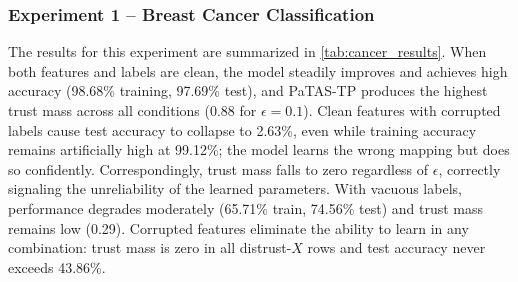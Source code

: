 \subsubsection*{Experiment 1 -- Breast Cancer Classification}
\begin{table}[ht]
\caption{Summary of final trust mass across four values of $\epsilon$ and corresponding train/test accuracies for the Breast Cancer Classification Experiment.}
\label{tab:cancer_results}
\end{table}

The results for this experiment are summarized in \cref{tab:cancer_results}. When both features and labels are clean, the model steadily improves and achieves high accuracy (98.68\% training, 97.69\% test), and \ac{PaTAS-TP} produces the highest trust mass across all conditions (0.88 for $\epsilon=0.1$). Clean features with corrupted labels cause test accuracy to collapse to 2.63\%, even while training accuracy remains artificially high at 99.12\%; the model learns the wrong mapping but does so confidently. Correspondingly, trust mass falls to zero regardless of $\epsilon$, correctly signaling the unreliability of the learned parameters. With vacuous labels, performance degrades moderately (65.71\% train, 74.56\% test) and trust mass remains low (0.29). Corrupted features eliminate the ability to learn in any combination: trust mass is zero in all distrust-$X$ rows and test accuracy never exceeds 43.86\%. 

